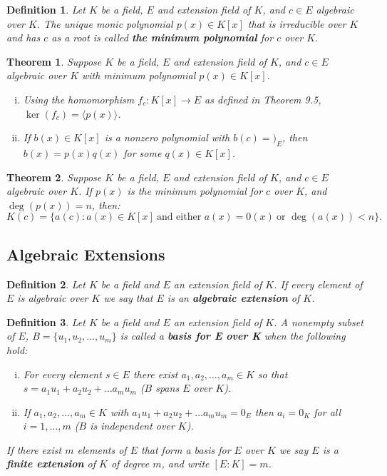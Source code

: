 \documentclass[letterpaper, 12pt]{article}
\newcommand{\pid}[1]{\langle #1 \rangle}
\newtheorem{defn}{Definition}
\newtheorem{thm}{Theorem}
\begin{document}
			\setcounter{defn}{9}
			\begin{defn}
			Let $K$ be a field, $E$ and extension field of $K$, and $c \in E$ algebraic over $K$.
			The unique monic polynomial $p(x) \in K[x]$ that is irreducible over $K$ and has $c$ as a root is called \textbf{\textit{the minimum polynomial}} for $c$ over $K$.
			\end{defn}

			\setcounter{thm}{11}
			\begin{thm}
			Suppose $K$ be a field, $E$ and extension field of $K$, and $c \in E$ algebraic over $K$ with minimum polynomial $p(x) \in K[x]$.
				\begin{enumerate}[(i)]
				\item Using the homomorphism $f_{c} : K[x] \to E$ as defined in Theorem 9.5, $\ker{(f_{c})} = \pid{p(x)}$.
				\item If $b(x) \in K[x]$ is a nonzero polynomial with $b(c) = )_{E}$, then $b(x) = p(x)q(x)$ for some $q(x) \in K[x]$.
				\end{enumerate}
			\end{thm}

			\begin{thm}
			Suppose $K$ be a field, $E$ and extension field of $K$, and $c \in E$ algebraic over $K$.
			If $p(x)$ is the minimum polynomial for $c$ over $K$, and $\deg(p(x)) = n$, then: $$K(c) = \{ a(c) : a(x) \in K[x] \ \text{and either } a(x) = 0(x) \ \text{or } \deg(a(x)) < n \}.$$
			\end{thm}

		\subsection{Algebraic Extensions}
		\label{sec:algebraic_extensions}
			\setcounter{defn}{15}
			\begin{defn}
			Let $K$ be a field and $E$ an extension field of $K$.
			If every element of $E$ is algebraic over $K$ we say that $E$ is an \textbf{algebraic extension} of $K$.
			\end{defn}

			\begin{defn}
			Let $K$ be a field and $E$ an extension field of $K$.
			A nonempty subset of $E$, $B = \{ u_{1}, u_{2}, \dots, u_{m} \}$ is called a \textbf{basis for E over K} when the following hold:
				\begin{enumerate}[(i)]
				\item For every element $s \in E$ there exist $a_{1}, a_{2}, \dots, a_{m} \in K$ so that $s = a_{1}u_{1} + a_{2}u_{2} + \dots a_{m}u_{m}$ ($B$ spans $E$ over $K$).
				\item If $a_{1}, a_{2}, \dots, a_{m} \in K$ with $a_{1}u_{1} + a_{2}u_{2} + \dots a_{m}u_{m} = 0_{E}$ then $a_{i} = 0_{K}$ for all $i = 1, \dots, m$ ($B$ is independent over $K$).
				\end{enumerate}
				
			If there exist $m$ elements of $E$ that form a basis for $E$ over $K$ we say $E$ is a \textbf{finite extension} of $K$ of degree $m$, and write $[E:K] = m$.
			\end{defn}
\end{document}

